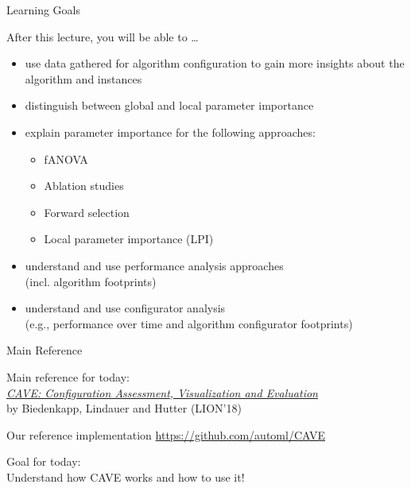 \begin{frame}[c]{Learning Goals}

After this lecture, you will be able to \ldots

\begin{itemize}
  \item use data gathered for algorithm configuration to gain more insights about the algorithm and instances
  \item distinguish between global and local parameter importance
  \item explain parameter importance for the following approaches:
  \begin{itemize}
    \item fANOVA
    \item Ablation studies
    \item Forward selection
    \item Local parameter importance (LPI)
  \end{itemize}
  \item understand and use performance analysis approaches\\ (incl. algorithm footprints)
  \item understand and use configurator analysis\\ (e.g., performance over time and algorithm configurator footprints)
\end{itemize}

\end{frame}
\begin{frame}[c]{Main Reference}

Main reference for today: \\
\href{https://ml.informatik.uni-freiburg.de/papers/18-LION12-CAVE.pdf}{\textit{CAVE: Configuration Assessment, Visualization and Evaluation}}
\\by Biedenkapp, Lindauer and Hutter (LION'18)

\bigskip
Our reference implementation
\url{https://github.com/automl/CAVE}

\bigskip

Goal for today:\\
Understand how CAVE works and how to use it!


\end{frame}
